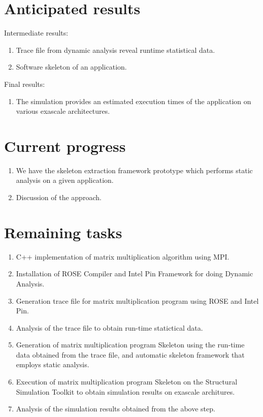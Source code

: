 \documentclass[10pt, twocolumn]{article}
\begin{document}
\section{Anticipated results}
Intermediate results:
\begin{enumerate}
\item Trace file from dynamic analysis reveal runtime statistical data.
\item Software skeleton of an application.
\end{enumerate}

Final results:
\begin{enumerate}
\item The simulation provides an estimated execution times of the application on various exascale architectures.
\end{enumerate}

\section{Current progress}
\begin{enumerate}
\item We have the skeleton extraction framework prototype which performs static analysis on a given application.
\item Discussion of the approach. 
\end{enumerate}

\section{Remaining tasks}

\begin{enumerate}
\item C++ implementation of matrix multiplication algorithm using MPI.
\item Installation of ROSE Compiler and Intel Pin Framework for doing Dynamic Analysis.
\item Generation trace file for matrix multiplication program using ROSE and Intel Pin.
\item Analysis of the trace file to obtain run-time statictical data.
\item Generation of matrix multiplication program Skeleton using the run-time data obtained from the trace file, and automatic skeleton framework that employs static analysis.
\item Execution of matrix multiplication program Skeleton on the Structural Simulation Toolkit to obtain simulation results on exascale architures.
\item Analysis of the simulation results obtained from the above step.
\end{enumerate}
\end{document}
